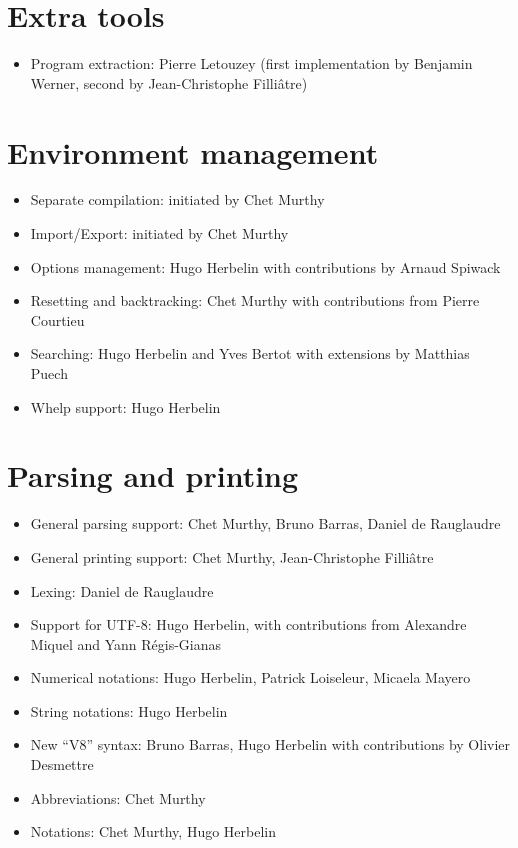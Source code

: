 \documentclass{article}
\begin{document}
\section{Extra tools}

\begin{itemize}
\item Program extraction: Pierre Letouzey (first implementation by
  Benjamin Werner, second by Jean-Christophe Filliâtre)
\end{itemize}

\section{Environment management}

\begin{itemize}
\item Separate compilation: initiated by Chet Murthy
\item Import/Export: initiated by Chet Murthy
\item Options management: Hugo Herbelin with contributions by Arnaud Spiwack
\item Resetting and backtracking: Chet Murthy with contributions from Pierre Courtieu
\item Searching: Hugo Herbelin and Yves Bertot with extensions by Matthias Puech
\item Whelp support: Hugo Herbelin
\end{itemize}

\section{Parsing and printing}

\begin{itemize}
\item General parsing support: Chet Murthy, Bruno Barras, Daniel de Rauglaudre
\item General printing support: Chet Murthy, Jean-Christophe Filliâtre
\item Lexing: Daniel de Rauglaudre
\item Support for UTF-8: Hugo Herbelin, with contributions from Alexandre Miquel and Yann Régis-Gianas
\item Numerical notations: Hugo Herbelin, Patrick Loiseleur, Micaela Mayero
\item String notations: Hugo Herbelin
\item New ``V8'' syntax: Bruno Barras, Hugo Herbelin with contributions by Olivier Desmettre
\item Abbreviations: Chet Murthy
\item Notations: Chet Murthy, Hugo Herbelin
\end{itemize}
\end{document}

